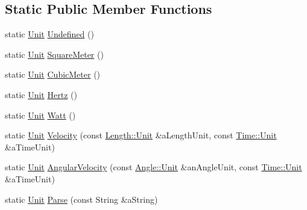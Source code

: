 \subsection*{Static Public Member Functions}
\begin{DoxyCompactItemize}
\item 
static \hyperlink{classlibrary_1_1physics_1_1units_1_1_derived_1_1_unit}{Unit} \hyperlink{classlibrary_1_1physics_1_1units_1_1_derived_1_1_unit_a0bd6544fb76067c5efc24b794e764301}{Undefined} ()
\item 
static \hyperlink{classlibrary_1_1physics_1_1units_1_1_derived_1_1_unit}{Unit} \hyperlink{classlibrary_1_1physics_1_1units_1_1_derived_1_1_unit_a5d30231014ef972169cca87c852cfee3}{Square\+Meter} ()
\item 
static \hyperlink{classlibrary_1_1physics_1_1units_1_1_derived_1_1_unit}{Unit} \hyperlink{classlibrary_1_1physics_1_1units_1_1_derived_1_1_unit_ad8e71820dabe4073b90ae3681f31b420}{Cubic\+Meter} ()
\item 
static \hyperlink{classlibrary_1_1physics_1_1units_1_1_derived_1_1_unit}{Unit} \hyperlink{classlibrary_1_1physics_1_1units_1_1_derived_1_1_unit_a3eb18a6cc5208068ea633533edddf0d3}{Hertz} ()
\item 
static \hyperlink{classlibrary_1_1physics_1_1units_1_1_derived_1_1_unit}{Unit} \hyperlink{classlibrary_1_1physics_1_1units_1_1_derived_1_1_unit_a242bb2e90f24200686e272312a2b05a9}{Watt} ()
\item 
static \hyperlink{classlibrary_1_1physics_1_1units_1_1_derived_1_1_unit}{Unit} \hyperlink{classlibrary_1_1physics_1_1units_1_1_derived_1_1_unit_a14a4c4646fc7af71b1b295039526c7a1}{Velocity} (const \hyperlink{classlibrary_1_1physics_1_1units_1_1_length_a3b8b39cd245cf6b19dc34459baeccb18}{Length\+::\+Unit} \&a\+Length\+Unit, const \hyperlink{classlibrary_1_1physics_1_1units_1_1_time_ab876a6a05c9a2f28905f2753bfd64109}{Time\+::\+Unit} \&a\+Time\+Unit)
\item 
static \hyperlink{classlibrary_1_1physics_1_1units_1_1_derived_1_1_unit}{Unit} \hyperlink{classlibrary_1_1physics_1_1units_1_1_derived_1_1_unit_addd355a633d2d5addd72efdd7cfebc65}{Angular\+Velocity} (const \hyperlink{classlibrary_1_1physics_1_1units_1_1_angle_a3c329d415a61783b16ce481874cc5956}{Angle\+::\+Unit} \&an\+Angle\+Unit, const \hyperlink{classlibrary_1_1physics_1_1units_1_1_time_ab876a6a05c9a2f28905f2753bfd64109}{Time\+::\+Unit} \&a\+Time\+Unit)
\item 
static \hyperlink{classlibrary_1_1physics_1_1units_1_1_derived_1_1_unit}{Unit} \hyperlink{classlibrary_1_1physics_1_1units_1_1_derived_1_1_unit_aa712ff5245e4badf615c04f8e1cbdb51}{Parse} (const String \&a\+String)
\end{DoxyCompactItemize}


